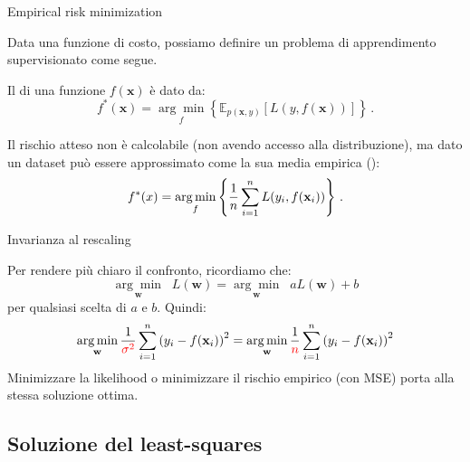 \documentclass[12pt,aspectratio=169]{beamer}
\begin{document}
\begin{frame}{Empirical risk minimization}
	
	Data una funzione di costo, possiamo definire un problema di apprendimento supervisionato come segue.
	\begin{tcolorbox}
		Il  di una funzione $f(\mathbf{x})$ è dato da:
		\begin{equation}
			f^*(\mathbf{x}) = \underset{f}{\arg\min} \left\{ \mathbb{E}_{p(\mathbf{x},y)} \left[ L(y, f(\mathbf{x})) \right] \right\} \,.
		\end{equation}
	\end{tcolorbox}
	Il rischio atteso non è calcolabile (non avendo accesso alla distribuzione), ma dato un dataset può essere approssimato come la sua media empirica ():
	\begin{equation}
		f^*(x) = \underset{f}{\operatorname*{arg\,min}} \left\{ \frac{1}{n} \sum_{i=1}^n L(y_i, f(\mathbf{x}_i)) \right\} \,.
	\end{equation}
	
\end{frame}

\begin{frame}{Invarianza al rescaling}
	
	Per rendere più chiaro il confronto, ricordiamo che:
	\begin{equation}
		\underset{\mathbf{w}}{\arg\min} \;\; L(\mathbf{w}) = \underset{\mathbf{w}}{\arg\min} \;\; aL(\mathbf{w}) +b
	\end{equation}
	per qualsiasi scelta di $a$ e $b$. Quindi:
	\begin{equation}
		\underset{\mathbf{w}}{\arg\min} \, \frac{1}{{\color{red}\sigma^2}}\sum_{i=1}^n \left(y_i - f(\mathbf{x}_i)\right)^2 = \underset{\mathbf{w}}{\arg\min} \, \frac{1}{{\color{red}n}}\sum_{i=1}^n \left(y_i - f(\mathbf{x}_i)\right)^2
	\end{equation}
	Minimizzare la likelihood o minimizzare il rischio empirico (con MSE) porta alla stessa soluzione ottima.
	
\end{frame}

\subsection{Soluzione del least-squares}
\end{document}
